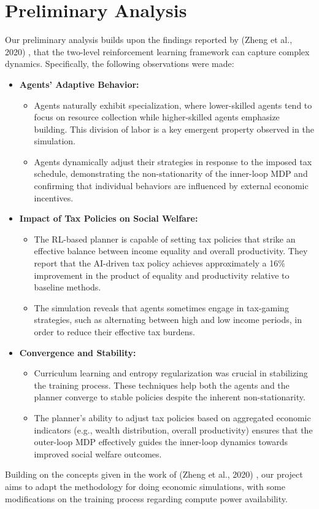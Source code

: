 \section{Preliminary Analysis}

Our preliminary analysis builds upon the findings reported by (Zheng et al., 2020) , that the two-level reinforcement learning framework can capture complex dynamics. Specifically, the following observations were made:

\begin{itemize}
    \item \textbf{Agents' Adaptive Behavior:}
    \begin{itemize}
        \item  Agents naturally exhibit specialization, where lower-skilled agents tend to focus on resource collection while higher-skilled agents emphasize building. This division of labor is a key emergent property observed in the simulation.
        \item  Agents dynamically adjust their strategies in response to the imposed tax schedule, demonstrating the non-stationarity of the inner-loop MDP and confirming that individual behaviors are influenced by external economic incentives.
    \end{itemize}
    
    \item \textbf{Impact of Tax Policies on Social Welfare:}
    \begin{itemize}
        \item The RL-based planner is capable of setting tax policies that strike an effective balance between income equality and overall productivity. They report that the AI-driven tax policy achieves approximately a 16\% improvement in the product of equality and productivity relative to baseline methods.
        \item The simulation reveals that agents sometimes engage in tax-gaming strategies, such as alternating between high and low income periods, in order to reduce their effective tax burdens.
    \end{itemize}
    
    \item \textbf{Convergence and Stability:}
    \begin{itemize}
        \item  Curriculum learning and entropy regularization was crucial in stabilizing the training process. These techniques help both the agents and the planner converge to stable policies despite the inherent non-stationarity.
        \item The planner's ability to adjust tax policies based on aggregated economic indicators (e.g., wealth distribution, overall productivity) ensures that the outer-loop MDP effectively guides the inner-loop dynamics towards improved social welfare outcomes.
    \end{itemize}
\end{itemize}

Building on the concepts given in the work of (Zheng et al., 2020) , our project aims to adapt the methodology for doing economic simulations, with some modifications on the training process regarding compute power availability.
